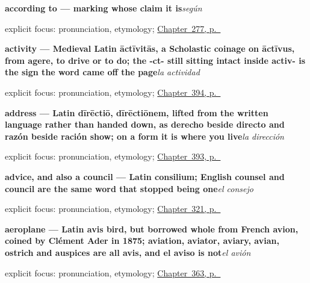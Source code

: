 \noindent\begin{minipage}[t]{\linewidth}
\raggedright
\textbf{according to — marking whose claim it is}\enspace\emph{según}\par
\footnotesize explicit focus: pronunciation, etymology; \hyperref[ch:fuentes]{Chapter~277, p.~\pageref*{ch:fuentes}}
\end{minipage}\par\smallskip

\noindent\begin{minipage}[t]{\linewidth}
\raggedright
\textbf{activity — Medieval Latin āctīvitās, a Scholastic coinage on āctīvus, from agere, to drive or to do; the -ct- still sitting intact inside activ- is the sign the word came off the page}\enspace\emph{la actividad}\par
\footnotesize explicit focus: pronunciation, etymology; \hyperref[ch:la-universidad-y-el-trabajo]{Chapter~394, p.~\pageref*{ch:la-universidad-y-el-trabajo}}
\end{minipage}\par\smallskip

\noindent\begin{minipage}[t]{\linewidth}
\raggedright
\textbf{address — Latin dīrēctiō, dīrēctiōnem, lifted from the written language rather than handed down, as derecho beside directo and razón beside ración show; on a form it is where you live}\enspace\emph{la dirección}\par
\footnotesize explicit focus: pronunciation, etymology; \hyperref[ch:el-ordenador-y-el-correo-electronico]{Chapter~393, p.~\pageref*{ch:el-ordenador-y-el-correo-electronico}}
\end{minipage}\par\smallskip

\noindent\begin{minipage}[t]{\linewidth}
\raggedright
\textbf{advice, and also a council — Latin consilium; English counsel and council are the same word that stopped being one}\enspace\emph{el consejo}\par
\footnotesize explicit focus: pronunciation, etymology; \hyperref[ch:placer-y-consejo]{Chapter~321, p.~\pageref*{ch:placer-y-consejo}}
\end{minipage}\par\smallskip

\noindent\begin{minipage}[t]{\linewidth}
\raggedright
\textbf{aeroplane — Latin avis bird, but borrowed whole from French avion, coined by Clément Ader in 1875; aviation, aviator, aviary, avian, ostrich and auspices are all avis, and el aviso is not}\enspace\emph{el avión}\par
\footnotesize explicit focus: pronunciation, etymology; \hyperref[ch:el-coche-y-el-avion]{Chapter~363, p.~\pageref*{ch:el-coche-y-el-avion}}
\end{minipage}\par\smallskip

